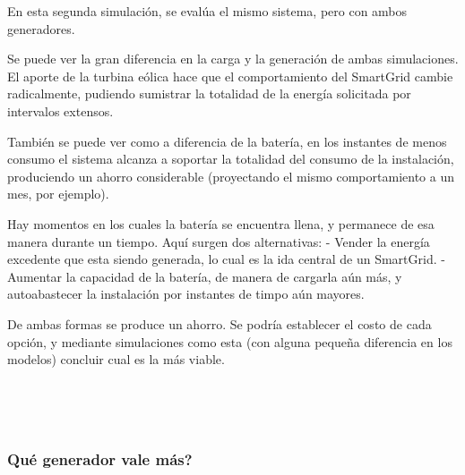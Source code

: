     En esta segunda simulación, se evalúa el mismo sistema, pero con ambos
generadores.

Se puede ver la gran diferencia en la carga y la generación de ambas
simulaciones. El aporte de la turbina eólica hace que el comportamiento
del SmartGrid cambie radicalmente, pudiendo sumistrar la totalidad de la
energía solicitada por intervalos extensos.

También se puede ver como a diferencia de la batería, en los instantes
de menos consumo el sistema alcanza a soportar la totalidad del consumo
de la instalación, produciendo un ahorro considerable (proyectando el
mismo comportamiento a un mes, por ejemplo).

Hay momentos en los cuales la batería se encuentra llena, y permanece de
esa manera durante un tiempo. Aquí surgen dos alternativas: - Vender la
energía excedente que esta siendo generada, lo cual es la ida central de
un SmartGrid. - Aumentar la capacidad de la batería, de manera de
cargarla aún más, y autoabastecer la instalación por instantes de timpo
aún mayores.

De ambas formas se produce un ahorro. Se podría establecer el costo de
cada opción, y mediante simulaciones como esta (con alguna pequeña
diferencia en los modelos) concluir cual es la más viable.

    \begin{center}
    \end{center}
    { \hspace*{\fill} \\}
    
    \begin{center}
    \end{center}
    { \hspace*{\fill} \\}
    
    \hypertarget{quuxe9-generador-vale-muxe1s}{%
\subsubsection{Qué generador vale
más?}\label{quuxe9-generador-vale-muxe1s}}

